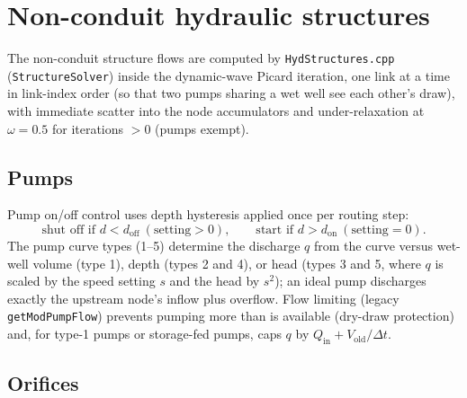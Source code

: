 \documentclass[11pt,a4paper]{article}
\begin{document}
\section{Non-conduit hydraulic structures}
\label{sec:structures}

The non-conduit structure flows are computed by \texttt{HydStructures.cpp}
(\texttt{StructureSolver}) inside the dynamic-wave Picard iteration, one link
at a time in link-index order (so that two pumps sharing a wet well see each
other's draw), with immediate scatter into the node accumulators and
under-relaxation at $\omega = 0.5$ for iterations $> 0$ (pumps exempt).

\subsection{Pumps}

Pump on/off control uses depth hysteresis applied once per routing step:
\begin{equation}
  \text{shut off if } d < d_{\mathrm{off}} \ (\text{setting} > 0),
  \qquad
  \text{start if } d > d_{\mathrm{on}} \ (\text{setting} = 0).
\end{equation}
The pump curve types (1--5) determine the discharge $q$ from the curve versus
wet-well volume (type 1), depth (types 2 and 4), or head (types 3 and 5, where
$q$ is scaled by the speed setting $s$ and the head by $s^2$); an ideal pump
discharges exactly the upstream node's inflow plus overflow. Flow limiting
(legacy \texttt{getModPumpFlow}) prevents pumping more than is available
(dry-draw protection) and, for type-1 pumps or storage-fed pumps, caps $q$ by
$Q_{\mathrm{in}} + V_{\mathrm{old}}/\Delta t$.

\subsection{Orifices}
\end{document}
